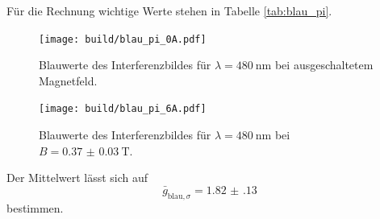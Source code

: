 Für die Rechnung wichtige Werte stehen in Tabelle \ref{tab:blau_pi}.
\begin{figure}[htb]
  \centering
  \texttt{[image: build/blau\_pi\_0A.pdf]}
  \caption{Blauwerte des Interferenzbildes für $\lambda=\SI{480}{\nano\meter}$ bei ausgeschaltetem Magnetfeld.}
  \label{fig:blau_pi_0A_plot}
\end{figure}
\begin{figure}[htb]
  \centering
  \texttt{[image: build/blau\_pi\_6A.pdf]}
  \caption{Blauwerte des Interferenzbildes für $\lambda=\SI{480}{\nano\meter}$ bei $B=\SI{0.37(3)}{\tesla}$.}
  \label{fig:blau_pi_6A_plot}
\end{figure}
Der Mittelwert lässt sich auf
\begin{equation}
  \label{eqn:g_blau_sigma}
  \bar{g}_{\text{blau},\sigma}=\num{1.82(13)}
\end{equation}
bestimmen.


